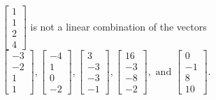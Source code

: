 \begin{exercise}
\begin{exerciseStatement}
  \end{exerciseStatement}
  \begin{exerciseAnswer}
   \(\left[\begin{array}{c}
1 \\
1 \\
2 \\
4
\end{array}\right]\) 
  	 is not  
	a linear combination of the vectors \(\left[\begin{array}{c}
-3 \\
-2 \\
1 \\
1
\end{array}\right] , \left[\begin{array}{c}
-4 \\
1 \\
0 \\
-2
\end{array}\right] , \left[\begin{array}{c}
3 \\
-3 \\
-3 \\
-1
\end{array}\right] , \left[\begin{array}{c}
16 \\
-3 \\
-8 \\
-2
\end{array}\right] , \text{ and } \left[\begin{array}{c}
0 \\
-1 \\
8 \\
10
\end{array}\right]\).

	
  


  \end{exerciseAnswer}
\end{exercise}